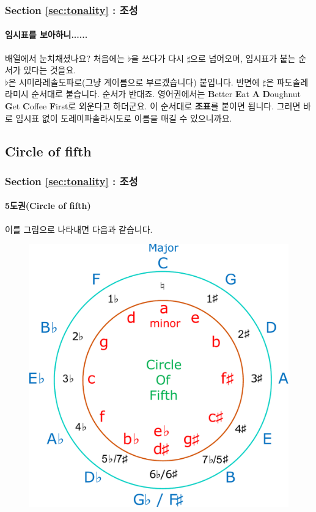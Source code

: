 \documentclass{beamer}
\begin{document}
	\begin{frame}
		\frametitle{Section \ref{sec:tonality} : 조성}
		\framesubtitle{임시표를 보아하니......}
		배열에서 눈치채셨나요? 처음에는 $\flat$을 쓰다가 다시 $\sharp$으로 넘어오며, 임시표가 붙는 순서가 있다는 것을요.\\
		$\flat$은 시미라레솔도파로(그냥 계이름으로 부르겠습니다) 붙입니다. 반면에  $\sharp$은 파도솔레라미시 순서대로 붙습니다. 순서가 반대죠. 영어권에서는 {\bf B}etter {\bf E}at {\bf A} {\bf D}oughnut {\bf G}et {\bf C}offee {\bf F}irst로 외운다고 하더군요. 이 순서대로 {\bf 조표}를 붙이면 됩니다. 그러면 바로 임시표 없이 도레미파솔라시도로 이름을 매길 수 있으니까요.
	\end{frame}
	
	\subsection{Circle of fifth}
	\begin{frame}
		\frametitle{Section \ref{sec:tonality} : 조성}
		\framesubtitle{5도권(Circle of fifth)}
		이를 그림으로 나타내면 다음과 같습니다.
		\begin{figure}
			\centering
			\includegraphics[height=0.7\textheight]{res/pdf/8/circle_of_fifth.pdf}
		\end{figure}
	\end{frame}
	
\end{document}
